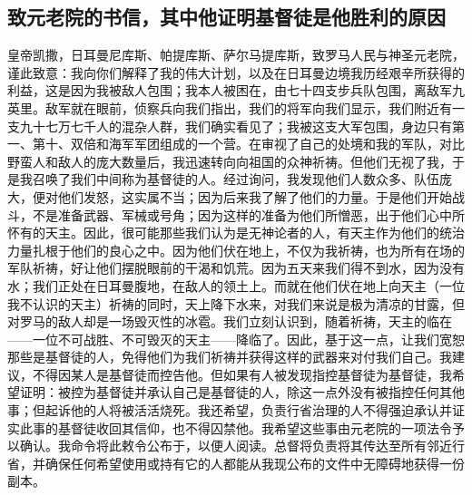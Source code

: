 
\subsection{致元老院的书信，其中他证明基督徒是他胜利的原因}

皇帝凯撒，日耳曼尼库斯、帕提库斯、萨尔马提库斯，致罗马人民与神圣元老院，谨此致意：我向你们解释了我的伟大计划，以及在日耳曼边境我历经艰辛所获得的利益，这是因为我被敌人包围；我本人被困在，由七十四支步兵队包围，离敌军九英里。敌军就在眼前，侦察兵向我们指出，我们的将军向我们显示，我们附近有一支九十七万七千人的混杂人群，我们确实看见了；我被这支大军包围，身边只有第一、第十、双倍和海军军团组成的一个营。在审视了自己的处境和我的军队，对比野蛮人和敌人的庞大数量后，我迅速转向向祖国的众神祈祷。但他们无视了我，于是我召唤了我们中间称为基督徒的人。经过询问，我发现他们人数众多、队伍庞大，便对他们发怒，这实属不当；因为后来我了解了他们的力量。于是他们开始战斗，不是准备武器、军械或号角；因为这样的准备为他们所憎恶，出于他们心中所怀有的天主。因此，很可能那些我们认为是无神论者的人，有天主作为他们的统治力量扎根于他们的良心之中。因为他们伏在地上，不仅为我祈祷，也为所有在场的军队祈祷，好让他们摆脱眼前的干渴和饥荒。因为五天来我们得不到水，因为没有水；我们正处在日耳曼腹地，在敌人的领土上。而就在他们伏在地上向天主（一位我不认识的天主）祈祷的同时，天上降下水来，对我们来说是极为清凉的甘露，但对罗马的敌人却是一场毁灭性的冰雹。我们立刻认识到，随着祈祷，天主的临在——一位不可战胜、不可毁灭的天主——降临了。因此，基于这一点，让我们宽恕那些是基督徒的人，免得他们为我们祈祷并获得这样的武器来对付我们自己。我建议，不得因某人是基督徒而控告他。但如果有人被发现指控基督徒为基督徒，我希望证明：被控为基督徒并承认自己是基督徒的人，除这一点外没有被指控任何其他事；但起诉他的人将被活活烧死。我还希望，负责行省治理的人不得强迫承认并证实此事的基督徒收回其信仰，也不得囚禁他。我希望这些事由元老院的一项法令予以确认。我命令将此敕令公布于，以便人阅读。总督将负责将其传达至所有邻近行省，并确保任何希望使用或持有它的人都能从我现公布的文件中无障碍地获得一份副本。\par


